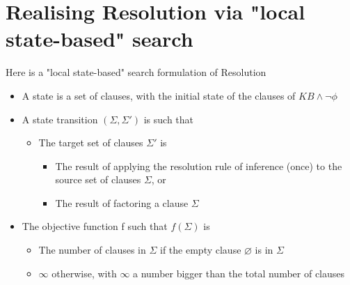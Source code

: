 \documentclass{article}[18pt]
\begin{document}
\section{Realising Resolution via "local state-based" search}
Here is a "local state-based" search formulation of Resolution
\begin{itemize}
	\item A state is a set of clauses, with the initial state of the clauses of $KB\land \lnot \phi$
	\item A state transition $(\Sigma,\Sigma')$ is such that
	\begin{itemize}
		\item The target set of clauses $\Sigma'$ is
		\begin{itemize}
			\item The result of applying the resolution rule of inference (once) to the source set of clauses $\Sigma$, or
			\item The result of factoring a clause $\Sigma$
		\end{itemize}
	\end{itemize}
	\item The objective function f such that $f(\Sigma)$ is
	\begin{itemize}
		\item The number of clauses in $\Sigma$ if the empty clause $\varnothing$ is in $\Sigma$
		\item $\infty$ otherwise, with $\infty$ a number bigger than the total number of clauses
	\end{itemize}
\end{itemize}
\end{document}
